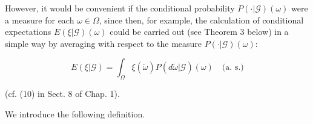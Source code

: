 However, it would be convenient if the conditional probability $P(\cdot | \mathcal{G})(\omega)$ were a measure for each $\omega \in \Omega$, since then, for example, the calculation of conditional expectations $E(\xi | \mathcal{G})(\omega)$ could be carried out (see Theorem 3 below) in a simple way by averaging with respect to the measure $P(\cdot | \mathcal{G})(\omega)$:

$$E(\xi | \mathcal{G}) = \int_{\Omega} \xi(\tilde{\omega}) P(d\tilde{\omega} | \mathcal{G})(\omega) \quad \text{(a. s.)}$$

(cf. (10) in Sect. 8 of Chap. 1).

We introduce the following definition.
